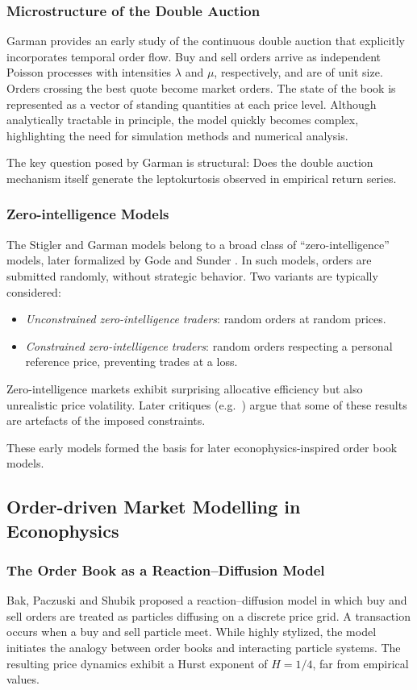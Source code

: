 \subsubsection{Microstructure of the Double Auction}
Garman \cite{garman1976} provides an early study of the continuous double auction that explicitly
incorporates temporal order flow. Buy and sell orders arrive as independent Poisson
processes with intensities $\lambda$ and $\mu$, respectively, and are of unit size. Orders crossing
the best quote become market orders. The state of the book is represented as a vector of
standing quantities at each price level. Although analytically tractable in principle, the
model quickly becomes complex, highlighting the need for simulation methods and
numerical analysis.

The key question posed by Garman is structural: Does the double auction mechanism
itself generate the leptokurtosis observed in empirical return series.

\subsubsection{Zero-intelligence Models}
The Stigler and Garman models belong to a broad class of ``zero-intelligence'' models,
later formalized by Gode and Sunder \cite{gode1993}. In such models, orders are submitted
randomly, without strategic behavior. Two variants are typically considered:
\begin{itemize}
    \item \emph{Unconstrained zero-intelligence traders}: random orders at random prices.
    \item \emph{Constrained zero-intelligence traders}: random orders respecting a personal reference
    price, preventing trades at a loss.
\end{itemize}

Zero-intelligence markets exhibit surprising allocative efficiency but also unrealistic price
volatility. Later critiques (e.g.\ \cite{cliffbruten1997}) argue that some of these results are artefacts of
the imposed constraints.

These early models formed the basis for later econophysics-inspired order book models.

\subsection{Order-driven Market Modelling in Econophysics}

\subsubsection{The Order Book as a Reaction--Diffusion Model}
Bak, Paczuski and Shubik \cite{bak1997} proposed a reaction--diffusion model in which buy and
sell orders are treated as particles diffusing on a discrete price grid. A transaction occurs
when a buy and sell particle meet. While highly stylized, the model initiates the analogy
between order books and interacting particle systems. The resulting price dynamics exhibit
a Hurst exponent of $H=1/4$, far from empirical values.

